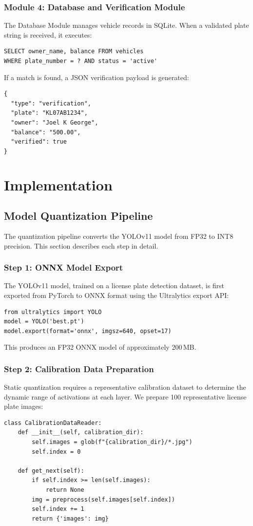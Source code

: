 \documentclass[11pt]{report}
\begin{document}
\subsection{Module 4: Database and Verification Module}
The Database Module manages vehicle records in SQLite. When a validated plate string is received, it executes:
\begin{verbatim}
SELECT owner_name, balance FROM vehicles 
WHERE plate_number = ? AND status = 'active'
\end{verbatim}

If a match is found, a JSON verification payload is generated:
\begin{verbatim}
{
  "type": "verification",
  "plate": "KL07AB1234",
  "owner": "Joel K George",
  "balance": "500.00",
  "verified": true
}
\end{verbatim}

\chapter{Implementation}
\section{Model Quantization Pipeline}

The quantization pipeline converts the YOLOv11 model from FP32 to INT8 precision. This section describes each step in detail.

\subsection{Step 1: ONNX Model Export}
The YOLOv11 model, trained on a license plate detection dataset, is first exported from PyTorch to ONNX format using the Ultralytics export API:
\begin{verbatim}
from ultralytics import YOLO
model = YOLO('best.pt')
model.export(format='onnx', imgsz=640, opset=17)
\end{verbatim}

This produces an FP32 ONNX model of approximately 200\,MB.

\subsection{Step 2: Calibration Data Preparation}
Static quantization requires a representative calibration dataset to determine the dynamic range of activations at each layer. We prepare 100 representative license plate images:
\begin{verbatim}
class CalibrationDataReader:
    def __init__(self, calibration_dir):
        self.images = glob(f"{calibration_dir}/*.jpg")
        self.index = 0
    
    def get_next(self):
        if self.index >= len(self.images):
            return None
        img = preprocess(self.images[self.index])
        self.index += 1
        return {'images': img}
\end{verbatim}
\end{document}
